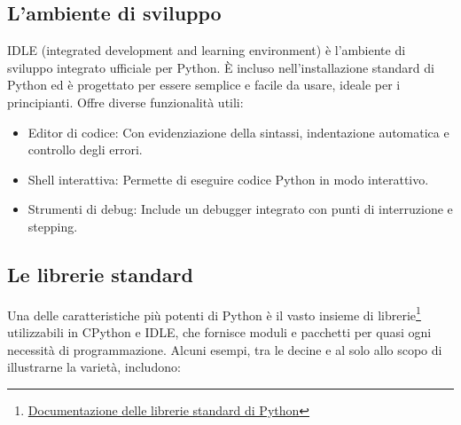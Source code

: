 \documentclass[
  letterpaper,
]{scrbook}
\begin{document}
\subsection{L'ambiente di sviluppo}\label{lambiente-di-sviluppo}

IDLE (integrated development and learning environment) è l'ambiente di
sviluppo integrato ufficiale per Python. È incluso nell'installazione
standard di Python ed è progettato per essere semplice e facile da
usare, ideale per i principianti. Offre diverse funzionalità utili:

\begin{itemize}
\item
  Editor di codice: Con evidenziazione della sintassi, indentazione
  automatica e controllo degli errori.
\item
  Shell interattiva: Permette di eseguire codice Python in modo
  interattivo.
\item
  Strumenti di debug: Include un debugger integrato con punti di
  interruzione e stepping.
\end{itemize}

\subsection{Le librerie standard}\label{le-librerie-standard}

Una delle caratteristiche più potenti di Python è il vasto insieme di
librerie\footnote{\href{https://docs.python.org/3/library/index.html}{Documentazione
  delle librerie standard di Python}} utilizzabili in CPython e IDLE,
che fornisce moduli e pacchetti per quasi ogni necessità di
programmazione. Alcuni esempi, tra le decine e al solo allo scopo di
illustrarne la varietà, includono:
\end{document}
